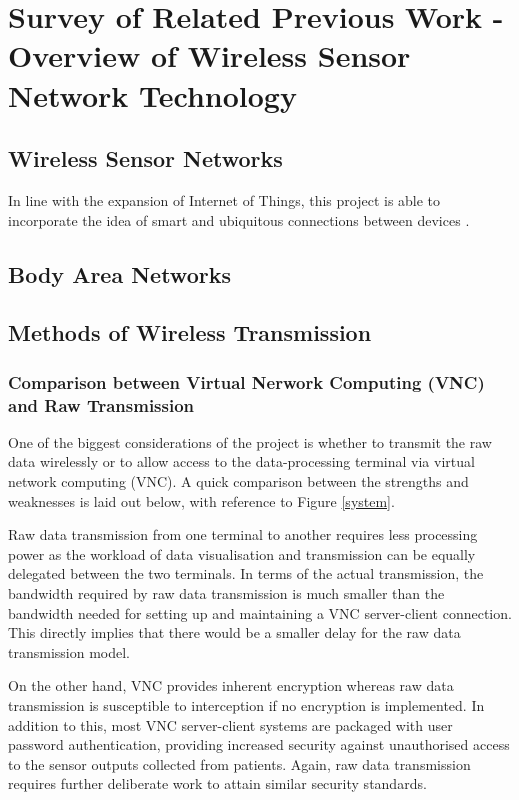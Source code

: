 \chapter{Survey of Related Previous Work - Overview of Wireless Sensor Network Technology}

\section{Wireless Sensor Networks}

In line with the expansion of Internet of Things, this project is able to incorporate the idea of smart and ubiquitous connections between devices \cite{gubbi2013internet}.

\section{Body Area Networks}

\section{Methods of Wireless Transmission}

\subsection{Comparison between Virtual Nerwork Computing (VNC) and Raw Transmission}

One of the biggest considerations of the project is whether to transmit the raw data wirelessly or to allow access to the data-processing terminal via virtual network computing (VNC). A quick comparison between the strengths and weaknesses is laid out below, with reference to Figure \ref{system}. 

Raw data transmission from one terminal to another requires less processing power as the workload of data visualisation and transmission can be equally delegated between the two terminals. In terms of the actual transmission, the bandwidth required by raw data transmission is much smaller than the bandwidth needed for setting up and maintaining a VNC server-client connection. This directly implies that there would be a smaller delay for the raw data transmission model. 

On the other hand, VNC provides inherent encryption whereas raw data transmission is susceptible to interception if no encryption is implemented. In addition to this, most VNC server-client systems are packaged with user password authentication, providing increased security against unauthorised access to the sensor outputs collected from patients. Again, raw data transmission requires further deliberate work to attain similar security standards. 

